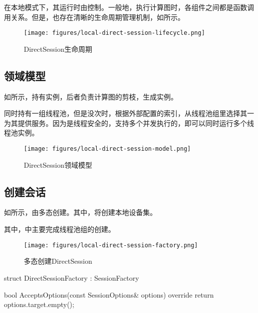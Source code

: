\begin{content}

在本地模式下，其运行时由控制。一般地，执行计算图时，各组件之间都是函数调用关系。但是，也存在清晰的生命周期管理机制，如所示。

\begin{figure}[H]
\centering
\texttt{[image: figures/local-direct-session-lifecycle.png]}
\caption{DirectSession生命周期}
 \label{fig:local-direct-session-lifecycle}
\end{figure}

\subsection{领域模型}

如所示，持有实例，后者负责计算图的剪枝，生成实例。

同时持有一组线程池，但是没次时，根据外部配置的索引，从线程池组里选择其一为其提供服务。因为是线程安全的，支持多个并发执行的，即可以同时运行多个线程池实例。

\begin{figure}[H]
\centering
\texttt{[image: figures/local-direct-session-model.png]}
\caption{DirectSession领域模型}
 \label{fig:local-direct-session-model}
\end{figure}

\subsection{创建会话}

如所示，由多态创建。其中，将创建本地设备集。

其中，中主要完成线程池组的创建。

\begin{figure}[H]
\centering
\texttt{[image: figures/local-direct-session-factory.png]}
\caption{多态创建DirectSession}
 \label{fig:local-direct-session-factory}
\end{figure}

\begin{leftbar}
\begin{c++}
struct DirectSessionFactory : SessionFactory {
  bool AcceptsOptions(const SessionOptions& options) override {
    return options.target.empty();
  }

}
\end{c++}
\end{leftbar}
\end{content}
